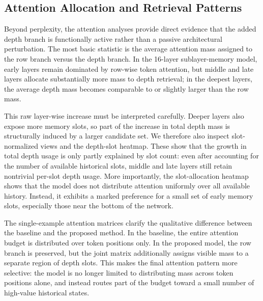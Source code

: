 \documentclass[11pt]{article}
\begin{document}
\subsection{Attention Allocation and Retrieval Patterns}

Beyond perplexity, the attention analyses provide direct evidence that the added depth branch is functionally active rather than a passive architectural perturbation. The most basic statistic is the average attention mass assigned to the row branch versus the depth branch. In the 16-layer sublayer-memory model, early layers remain dominated by row-wise token attention, but middle and late layers allocate substantially more mass to depth retrieval; in the deepest layers, the average depth mass becomes comparable to or slightly larger than the row mass.

This raw layer-wise increase must be interpreted carefully. Deeper layers also expose more memory slots, so part of the increase in total depth mass is structurally induced by a larger candidate set. We therefore also inspect slot-normalized views and the depth-slot heatmap. These show that the growth in total depth usage is only partly explained by slot count: even after accounting for the number of available historical slots, middle and late layers still retain nontrivial per-slot depth usage. More importantly, the slot-allocation heatmap shows that the model does not distribute attention uniformly over all available history. Instead, it exhibits a marked preference for a small set of early memory slots, especially those near the bottom of the network.

The single-example attention matrices clarify the qualitative difference between the baseline and the proposed method. In the baseline, the entire attention budget is distributed over token positions only. In the proposed model, the row branch is preserved, but the joint matrix additionally assigns visible mass to a separate region of depth slots. This makes the final attention pattern more selective: the model is no longer limited to distributing mass across token positions alone, and instead routes part of the budget toward a small number of high-value historical states.
\end{document}
